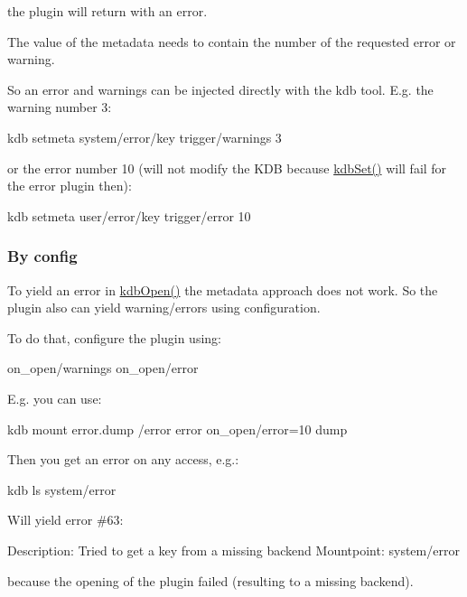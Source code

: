 the plugin will return with an error.

The value of the metadata needs to contain the number of the requested error or warning.

So an error and warnings can be injected directly with the kdb tool. E.\+g. the warning number 3\+: \begin{DoxyVerb}kdb setmeta system/error/key trigger/warnings 3
\end{DoxyVerb}


or the error number 10 (will not modify the K\+DB because {\ttfamily \hyperlink{group__kdb_ga11436b058408f83d303ca5e996832bcf}{kdb\+Set()}} will fail for the error plugin then)\+: \begin{DoxyVerb}kdb setmeta user/error/key trigger/error 10
\end{DoxyVerb}


\subsubsection*{By config}

To yield an error in \hyperlink{group__kdb_ga6808defe5870f328dd17910aacbdc6ca}{kdb\+Open()} the metadata approach does not work. So the plugin also can yield warning/errors using configuration.

To do that, configure the plugin using\+: \begin{DoxyVerb}on_open/warnings
on_open/error
\end{DoxyVerb}


E.\+g. you can use\+: \begin{DoxyVerb}kdb mount error.dump /error error on_open/error=10 dump
\end{DoxyVerb}


Then you get an error on any access, e.\+g.\+: \begin{DoxyVerb}kdb ls system/error
\end{DoxyVerb}


Will yield error \#63\+: \begin{DoxyVerb}Description: Tried to get a key from a missing backend
Mountpoint: system/error
\end{DoxyVerb}


because the opening of the plugin failed (resulting to a missing backend). 